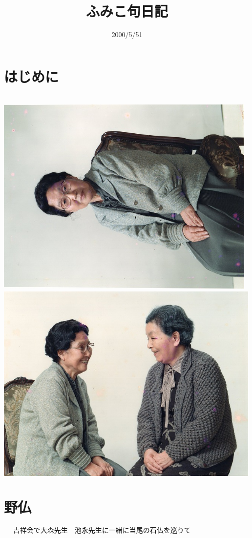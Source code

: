 \documentclass[b5paper]{tbook}
\begin{document}
\title{ふみこ句日記}
\date{2000/5/51}
\maketitle

\chapter*{はじめに}


　
\includegraphics[height=10cm, angle=90, bb=0 0 640 640]{cat.jpg}
\includegraphics[height=10cm, angle=90, bb=0 0 640 640]{fumiko2.jpg}
\chapter{野仏}
　
吉祥会で大森先生　池永先生に一緒に当尾の石仏を巡りて　
\end{document}
